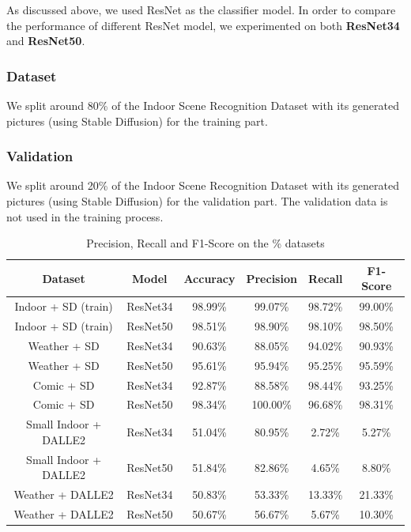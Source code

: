 \documentclass[11pt]{article}
\begin{document}
As discussed above, we used ResNet as the classifier model. In order to compare the performance of different ResNet model, we experimented on both \textbf{ResNet34} and \textbf{ResNet50}.

\subsubsection{Dataset}

We split around 80\% of the Indoor Scene Recognition Dataset with its generated pictures (using Stable Diffusion) for the training part.

\subsubsection{Validation}

We split around 20\% of the Indoor Scene Recognition Dataset with its generated pictures (using Stable Diffusion) for the validation part. The validation data is not used in the training process.
\begin{table}
  \centering
  \begin{tabular}{c|c||c|c|c|c}
    \hline
    \textbf{Dataset}      & \textbf{Model} & \textbf{Accuracy} & \textbf{Precision} & \textbf{Recall} & \textbf{F1-Score} \\
    \hline
    Indoor + SD (train)   & ResNet34       & {98.99\%}         & {99.07\%}          & {98.72\%}       & {99.00\%}         \\
    Indoor + SD (train)   & ResNet50       & {98.51\%}         & {98.90\%}          & {98.10\%}       & {98.50\%}         \\
    \hline
    Weather + SD          & ResNet34       & {90.63\%}         & {88.05\%}          & {94.02\%}       & {90.93\%}         \\
    Weather + SD          & ResNet50       & {95.61\%}         & {95.94\%}          & {95.25\%}       & {95.59\%}         \\
    Comic + SD            & ResNet34       & {92.87\%}         & {88.58\%}          & {98.44\%}       & {93.25\%}         \\
    Comic + SD            & ResNet50       & {98.34\%}         & {100.00\%}         & {96.68\%}       & {98.31\%}         \\
    Small Indoor + DALLE2 & ResNet34       & {51.04\%}         & {80.95\%}          & {2.72\%}        & {5.27\%}          \\
    Small Indoor + DALLE2 & ResNet50       & {51.84\%}         & {82.86\%}          & {4.65\%}        & {8.80\%}          \\
    Weather + DALLE2      & ResNet34       & {50.83\%}         & {53.33\%}          & {13.33\%}       & {21.33\%}         \\
    Weather + DALLE2      & ResNet50       & {50.67\%}         & {56.67\%}          & {5.67\%}        & {10.30\%}         \\
    \hline
  \end{tabular}
  \caption{Precision, Recall and F1-Score on the \% datasets}
  \label{tab:results-on-datasets}
\end{table}
\end{document}
